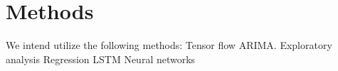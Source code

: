 \section{Methods}

We intend utilize the following methods:  
Tensor flow 
ARIMA. 
Exploratory analysis 
Regression 
LSTM 
Neural networks 